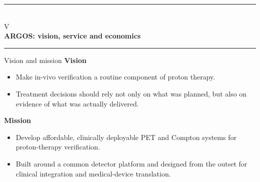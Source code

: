 \documentclass[aspectratio=169,11pt]{beamer}
\newcommand{\hi}[1]{\textcolor{crRed}{#1}}
\begin{document}
\begin{frame}
\centering
\vspace{1.6cm}
{\color{crBlue}\rule{0.55\textwidth}{1.1pt}}\\[6mm]
{\Large\color{crGrey} V}\\[4mm]
{\Huge\bfseries\color{crBlue} ARGOS: vision, service and economics}\\[6mm]
{\color{crBlue}\rule{0.55\textwidth}{1.1pt}}
\end{frame}

\begin{frame}{Vision and mission}
\small
\textbf{\color{crBlue}Vision}
\begin{itemize}
\item Make \hi{in-vivo verification a routine component of proton therapy}.
\item Treatment decisions should rely not only on what was planned, but also on \hi{evidence of what was actually delivered}.
\end{itemize}
\par\vspace{3mm}
\textbf{\color{crBlue}Mission}
\begin{itemize}
\item Develop \hi{affordable, clinically deployable PET and Compton systems} for proton-therapy verification.
\item Built around a common detector platform and designed from the outset for \hi{clinical integration} and \hi{medical-device translation}.
\end{itemize}
\end{frame}
\end{document}
